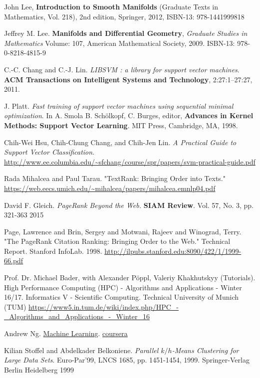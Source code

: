 \documentclass[10pt]{amsart}
\begin{document}
\begin{thebibliography}{9}
John Lee, \textbf{Introduction to Smooth Manifolds} (Graduate Texts in Mathematics, Vol. 218), 2nd edition, Springer,  2012, ISBN-13: 978-1441999818

Jeffrey M. Lee. \textbf{Manifolds and Differential Geometry}, \emph{Graduate Studies in Mathematics} Volume: 107, American Mathematical Society, 2009. ISBN-13: 978-0-8218-4815-9



  C.-C. Chang and C.-J. Lin. \emph{LIBSVM : a library for support vector machines}. \textbf{ACM Transactions on Intelligent Systems and Technology}, 2:27:1--27:27, 2011. 

  J. Platt. \emph{Fast training of support vector machines using sequential minimal optimization}. In A. Smola B. Schölkopf, C. Burges, editor, \textbf{Advances in Kernel Methods: Support Vector Learning}. MIT Press, Cambridge, MA, 1998.

Chih-Wei Hsu, Chih-Chung Chang, and Chih-Jen Lin.  \emph{A Practical Guide to Support Vector Classification}.  \url{http://www.ee.columbia.edu/~sfchang/course/spr/papers/svm-practical-guide.pdf}

Rada Mihalcea and Paul Tarau.  "TextRank: Bringing Order into Texts."  
\url{https://web.eecs.umich.edu/~mihalcea/papers/mihalcea.emnlp04.pdf}  

David F. Gleich.  \emph{PageRank Beyond the Web.}  \textbf{SIAM Review}.  Vol. 57, No. 3, pp. 321-363 2015  
  
Page, Lawrence and Brin, Sergey and Motwani, Rajeev and Winograd, Terry.  "The PageRank Citation Ranking: Bringing Order to the Web." Technical Report. Stanford InfoLab.  1998.  \url{http://ilpubs.stanford.edu:8090/422/1/1999-66.pdf}  
  
Prof. Dr. Michael Bader, with Alexander P\"{o}ppl, Valeriy Khakhutskyy (Tutorials).  High Performance Computing (HPC) - Algorithms and Applications - Winter 16/17.  Informatics V - Scientific Computing.  Technical University of Munich (TUM)
\url{https://www5.in.tum.de/wiki/index.php/HPC_-_Algorithms_and_Applications_-_Winter_16}


Andrew Ng.  \href{https://www.coursera.org/learn/machine-learning/home/welcome}{Machine Learning}.  \href{https://www.coursera.org}{coursera}


Kilian Stoffel and Abdelkader Belkoniene.  \emph{Parallel $k/h$-Means Clustering for Large Data Sets}.  Euro-Par'99, LNCS 1685, pp. 1451-1454, 1999.  Springer-Verlag Berlin Heidelberg 1999


\end{thebibliography}
\end{document}
